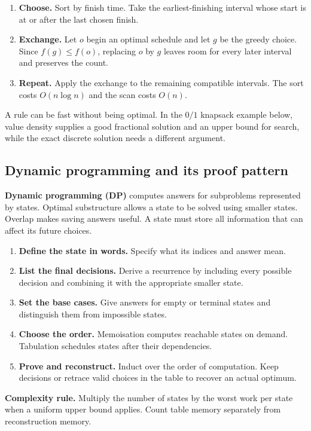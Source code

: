 \documentclass[12pt,a4paper]{article}
\begin{document}
\begin{tcolorbox}[examplebox, title={Interval scheduling by earliest finish}]
\begin{enumerate}[leftmargin=*, itemsep=2pt]
  \item \textbf{Choose.} Sort by finish time. Take the earliest-finishing interval whose start is at or after the last chosen finish.
  \item \textbf{Exchange.} Let $o$ begin an optimal schedule and let $g$ be the greedy choice. Since $f(g)\le f(o)$, replacing $o$ by $g$ leaves room for every later interval and preserves the count.
  \item \textbf{Repeat.} Apply the exchange to the remaining compatible intervals. The sort costs $O(n\log n)$ and the scan costs $O(n)$.
\end{enumerate}
\end{tcolorbox}

A rule can be fast without being optimal. In the $0/1$ knapsack example below, value density supplies a good fractional solution and an upper bound for search, while the exact discrete solution needs a different argument.

\subsection{Dynamic programming and its proof pattern}
\begin{tcolorbox}[defbox, title={Dynamic programming}]
\textbf{Dynamic programming (DP)} computes answers for subproblems represented by states. Optimal substructure allows a state to be solved using smaller states. Overlap makes saving answers useful. A state must store all information that can affect its future choices.
\end{tcolorbox}

\begin{enumerate}[leftmargin=*, itemsep=3pt, topsep=4pt]
  \item \textbf{Define the state in words.} Specify what its indices and answer mean.
  \item \textbf{List the final decisions.} Derive a recurrence by including every possible decision and combining it with the appropriate smaller state.
  \item \textbf{Set the base cases.} Give answers for empty or terminal states and distinguish them from impossible states.
  \item \textbf{Choose the order.} Memoisation computes reachable states on demand. Tabulation schedules states after their dependencies.
  \item \textbf{Prove and reconstruct.} Induct over the order of computation. Keep decisions or retrace valid choices in the table to recover an actual optimum.
\end{enumerate}
\textbf{Complexity rule.} Multiply the number of states by the worst work per state when a uniform upper bound applies. Count table memory separately from reconstruction memory.
\end{document}
